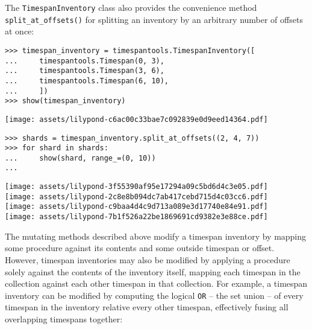 \noindent The \texttt{TimespanInventory} class also provides the convenience
method \texttt{split\_at\_offsets()} for splitting an inventory by an arbitrary
number of offsets at once:

\begin{comment}
<abjad>
timespan_inventory = timespantools.TimespanInventory([
    timespantools.Timespan(0, 3),
    timespantools.Timespan(3, 6),
    timespantools.Timespan(6, 10),
    ])
show(timespan_inventory)
shards = timespan_inventory.split_at_offsets((2, 4, 7))
for shard in shards:
    show(shard, range_=(0, 10))

</abjad>
\end{comment}

\begin{abjadbookoutput}
\begin{singlespacing}
\vspace{-0.5\baselineskip}
\begin{verbatim}
>>> timespan_inventory = timespantools.TimespanInventory([
...     timespantools.Timespan(0, 3),
...     timespantools.Timespan(3, 6),
...     timespantools.Timespan(6, 10),
...     ])
>>> show(timespan_inventory)
\end{verbatim}
\noindent\texttt{[image: assets/lilypond-c6ac00c33bae7c092839e0d9eed14364.pdf]}
\begin{verbatim}
>>> shards = timespan_inventory.split_at_offsets((2, 4, 7))
>>> for shard in shards:
...     show(shard, range_=(0, 10))
...
\end{verbatim}
\noindent\texttt{[image: assets/lilypond-3f55390af95e17294a09c5bd6d4c3e05.pdf]}\\
\noindent\texttt{[image: assets/lilypond-2c8e8b094dc7ab417cebd715d4c03cc6.pdf]}\\
\noindent\texttt{[image: assets/lilypond-c9baa4d4c9d713a089e3d17740e84e91.pdf]}\\
\noindent\texttt{[image: assets/lilypond-7b1f526a22be1869691cd9382e3e88ce.pdf]}
\end{singlespacing}
\end{abjadbookoutput}

\noindent The mutating methods described above modify a timespan inventory
by mapping some procedure against its contents and some outside timespan or
offset. However, timespan inventories may also be modified by applying a
procedure solely against the contents of the inventory itself, mapping each
timespan in the collection against each other timespan in that collection.
For example, a timespan inventory can be modified by computing the logical
\texttt{OR} -- the set union -- of every timespan in the inventory relative
every other timespan, effectively fusing all overlapping timespans together:

